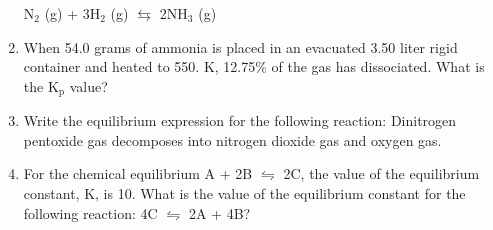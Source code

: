\documentclass[../hchem.tex]{subfiles}
\begin{document}
\begin{enumerate}
    \begin{center}
        N$_2$ (g) + 3H$_2$ (g) $\leftrightarrows$ 2NH$_3$ (g)
    \end{center}
    \item When 54.0 grams of ammonia is placed in an evacuated 3.50 liter rigid container and heated to 550. K, 12.75\% of the gas has dissociated. What is the K$_{\text{p}}$ value?
    \item Write the equilibrium expression for the following reaction: Dinitrogen pentoxide gas decomposes into nitrogen dioxide gas and oxygen gas.
    \item For the chemical equilibrium A + 2B $\leftrightharpoons$ 2C, the value of the equilibrium constant, K, is 10. What is the value of the equilibrium constant for the following reaction: 4C $\leftrightharpoons$ 2A + 4B?
\end{enumerate}
\end{document}
